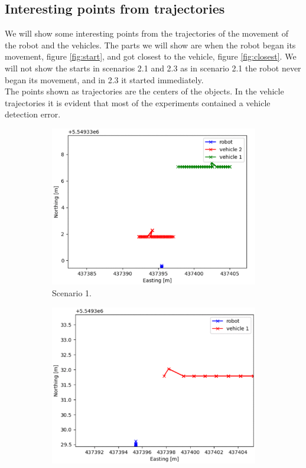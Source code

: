     \subsection{Interesting points from trajectories}
        We will show some interesting points from the trajectories of the movement of the robot and the vehicles. The parts we will show are when the robot began its movement, figure \ref{fig:start}, and got closest to the vehicle, figure \ref{fig:closest}. We will not show the starts in scenarios 2.1 and 2.3 as in scenario 2.1 the robot never began its movement, and in 2.3 it started immediately.\\
        The points shown as trajectories are the centers of the objects. In the vehicle trajectories it is evident that most of the experiments contained a vehicle detection error. 
        \begin{figure}[H]
            \centering
            \begin{subfigure}{0.49\linewidth}
                \centering
                \includegraphics[width=\linewidth]{images/simulations/start_1.png}
                \caption{Scenario 1.}
            \end{subfigure}
            \begin{subfigure}{0.49\linewidth}
                \centering
                \includegraphics[width=\linewidth]{images/simulations/start_2_2.png}

\end{subfigure}
\end{figure}
